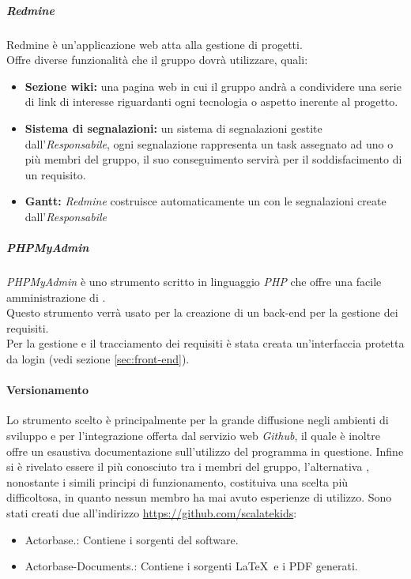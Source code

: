 \documentclass{scalatekids-article}
\begin{document}
\subparagraph{Redmine}
Redmine è un'applicazione web atta alla gestione di progetti.\\
Offre diverse funzionalità che il gruppo dovrà utilizzare, quali:
\begin{itemize}
\item\textbf{Sezione wiki:} una pagina web in cui il gruppo andrà a condividere una serie di link di interesse riguardanti ogni tecnologia o aspetto inerente al progetto.
\item\textbf{Sistema di segnalazioni:} un sistema di segnalazioni gestite dall'\textit{Responsabile}, ogni segnalazione rappresenta un task assegnato ad uno o più membri del gruppo, il suo conseguimento servirà per il soddisfacimento di un requisito.
\item\textbf{Gantt:} \textit{Redmine} costruisce automaticamente un  con le segnalazioni create dall'\textit{Responsabile}
\end{itemize}

\subparagraph{PHPMyAdmin}
\textit{PHPMyAdmin} è uno strumento scritto in linguaggio \textit{PHP} che offre una facile amministrazione di \textit{}.\\
Questo strumento verrà usato per la creazione di un back-end per la gestione dei requisiti.\\
Per la gestione e il tracciamento dei requisiti è stata creata un'interfaccia protetta da login (vedi sezione \ref{sec:front-end}).

\paragraph{Versionamento}
Lo strumento scelto è  principalmente per la grande diffusione negli
ambienti di sviluppo e per l'integrazione offerta dal servizio web
\textit{Github}, il quale è inoltre offre un esaustiva documentazione
sull'utilizzo del programma in questione. Infine  si è rivelato essere
il più conosciuto tra i membri del gruppo, l'alternativa , nonostante
i simili principi di funzionamento, costituiva una scelta più difficoltosa, in
quanto nessun membro ha mai avuto esperienze di utilizzo.
Sono stati creati due  all'indirizzo \url{https://github.com/scalatekids}:
\begin{itemize}
\item Actorbase.: Contiene i sorgenti del software.
\item Actorbase-Documents.: Contiene i sorgenti \LaTeX\ e i PDF generati.
\end{itemize}
\end{document}
